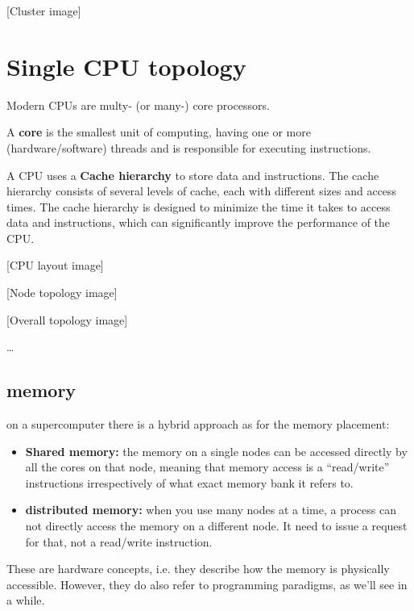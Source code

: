 [Cluster image]

\section{Single CPU topology}

Modern CPUs are multy- (or many-) core processors.

\begin{definitionblock}
    A \textbf{core} is the smallest unit of computing, having one or more (hardware/software) threads and is responsible for executing instructions.
\end{definitionblock}

A CPU uses a \textbf{Cache hierarchy} to store data and instructions. The cache hierarchy consists of several levels of cache, each with different sizes and access times. The cache hierarchy is designed to minimize the time it takes to access data and instructions, which can significantly improve the performance of the CPU.

[CPU layout image]


[Node topology image]


[Overall topology image]


\dots

\subsection{memory}

on a supercomputer there is a hybrid approach as for the memory placement:

\begin{itemize}
    \item \textbf{Shared memory:} the memory on a single nodes can be accessed directly by all the cores on that node, meaning that memory access is a “read/write” instructions irrespectively of what exact memory bank it refers to.
    \item \textbf{distributed memory:} when you use many nodes at a time, a process can not directly access the memory on a different node. It need to issue a request for that, not a read/write instruction.
\end{itemize}

These are hardware concepts, i.e. they describe how the memory is physically accessible. However, they do also refer to programming paradigms, as we’ll see in a while.


